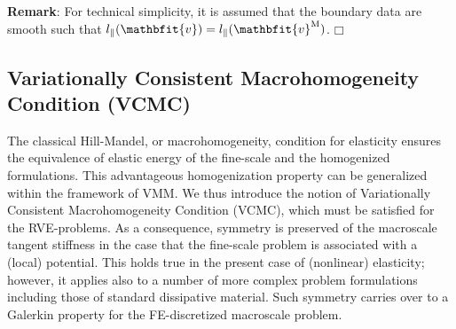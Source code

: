\documentclass[12pt,a4paper]{article}
\renewcommand{\ta}[1]{\mathbfit{#1}}
\renewcommand{\Box}{\mdlgwhtsquare}
\begin{document}
\textbf{Remark}: For technical simplicity, it is assumed that the boundary data are smooth such that $l_\parallel(\ta{v})=l_\parallel(\ta{v}^\macro)$. $\Box$

\subsection{Variationally Consistent Macrohomogeneity Condition (VCMC)}

The classical Hill-Mandel, or macrohomogeneity, condition for elasticity ensures the equivalence of elastic energy of the fine-scale and the homogenized formulations.
This advantageous homogenization property can be generalized within the framework of VMM.
We thus introduce the notion of Variationally Consistent Macrohomogeneity Condition (VCMC), which must be satisfied for the RVE-problems.
As a consequence, symmetry is preserved of the macroscale tangent stiffness in the case that the fine-scale problem is associated with a (local) potential.
This holds true in the present case of (nonlinear) elasticity; however, it applies also to a number of more complex problem formulations including those of standard dissipative material.
Such symmetry carries over to a Galerkin property for the FE-discretized macroscale problem.
\end{document}
